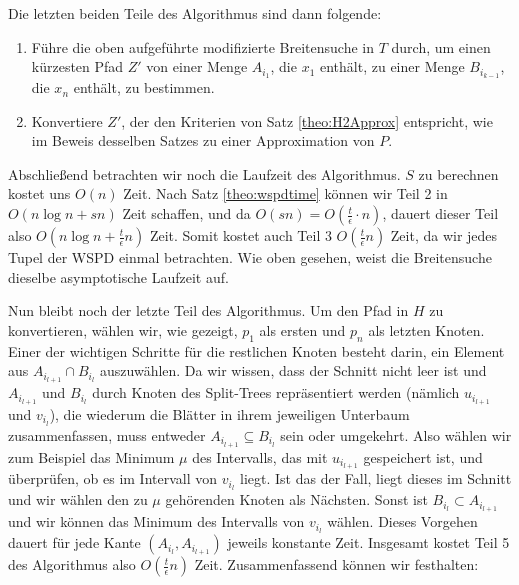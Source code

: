     Die letzten beiden Teile des Algorithmus sind dann folgende:
    \begin{enumerate}[start=4, topsep=4mm]
    	\item Führe die oben aufgeführte modifizierte Breitensuche in $T$ durch, um einen kürzesten Pfad $Z'$ von einer Menge $A_{i_1}$, die $x_1$ enthält, zu einer Menge $B_{i_{k-1}}$, die $x_n$ enthält, zu bestimmen.
    	\item Konvertiere $Z'$, der den Kriterien von Satz \ref{theo:H2Approx} entspricht, wie im Beweis desselben Satzes zu einer Approximation von $P$.
    \end{enumerate}
    Abschließend betrachten wir noch die Laufzeit des Algorithmus. $S$ zu berechnen kostet uns $O(n)$ Zeit. 
    Nach Satz \ref{theo:wspdtime} können wir Teil 2 in $O(n \log n + sn)$ Zeit schaffen, und da $O(sn) = O(\frac{t}{\epsilon}\cdot n)$, dauert dieser Teil also $O(n \log n + \frac{t}{\epsilon}n)$ Zeit. 
    Somit kostet auch Teil 3 $O(\frac{t}{\epsilon}n)$ Zeit, da wir jedes Tupel der WSPD einmal betrachten. 
    Wie oben gesehen, weist die Breitensuche dieselbe asymptotische Laufzeit auf. 
    
    Nun bleibt noch der letzte Teil des Algorithmus. 
    Um den Pfad in $H$ zu konvertieren, wählen wir, wie gezeigt, $p_1$ als ersten und $p_n$ als letzten Knoten. 
    Einer der wichtigen Schritte für die restlichen Knoten besteht darin, ein Element aus $A_{i_{l+1}} \cap B_{i_l}$ auszuwählen. 
    Da wir wissen, dass der Schnitt nicht leer ist und $A_{i_{l+1}}$ und $B_{i_l}$ durch Knoten des Split-Trees repräsentiert werden (nämlich $u_{i_{l+1}}$ und $v_{i_l}$), die wiederum die Blätter in ihrem jeweiligen Unterbaum zusammenfassen, muss entweder $A_{i_{l+1}}\subseteq B_{i_l}$ sein oder umgekehrt. 
    Also wählen wir zum Beispiel das Minimum $\mu$ des Intervalls, das mit $u_{i_{l+1}}$ gespeichert ist, und überprüfen, ob es im Intervall von $v_{i_l}$ liegt. 
    Ist das der Fall, liegt dieses im Schnitt und wir wählen den zu $\mu$ gehörenden Knoten als Nächsten. 
    Sonst ist $B_{i_l}\subset A_{i_{l+1}}$ und wir können das Minimum des Intervalls von $v_{i_l}$ wählen. 
    Dieses Vorgehen dauert für jede Kante $(A_{i_l}, A_{i_{l+1}})$ jeweils konstante Zeit. 
    Insgesamt kostet Teil 5 des Algorithmus also $O(\frac{t}{\epsilon}n)$ Zeit.
    Zusammenfassend können wir festhalten:
    
